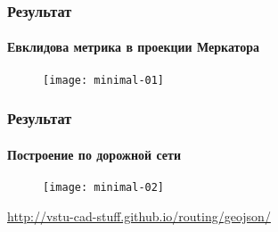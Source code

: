 





\begin{frame}
    \frametitle{Результат}
    \framesubtitle{Евклидова метрика в проекции Меркатора}
    \begin{figure}[ht!]
        \centering
        \texttt{[image: minimal-01]}
    \end{figure}
\end{frame}

\begin{frame}
    \frametitle{Результат}
    \framesubtitle{Построение по дорожной сети}
    \begin{figure}[ht!]
        \centering
        \texttt{[image: minimal-02]}
    \end{figure}
    \url{http://vstu-cad-stuff.github.io/routing/geojson/}
\end{frame}

